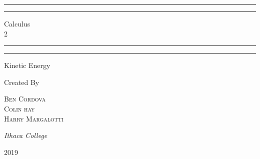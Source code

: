 \documentclass[a4paper, 11pt, oneside]{book} %
\begin{document}
 

\begin{titlepage} %

	\centering %
	
	\scshape %
	
	\vspace*{\baselineskip} %
	
	
	\rule{\textwidth}{1.6pt}\vspace*{-\baselineskip}\vspace*{2pt} %
	\rule{\textwidth}{0.4pt} %
	
	\vspace{0.75\baselineskip} %
	
	{\LARGE Calculus\\ 2\\} %
	
	\vspace{0.75\baselineskip} %
	
	\rule{\textwidth}{0.4pt}\vspace*{-\baselineskip}\vspace{3.2pt} %
	\rule{\textwidth}{1.6pt} %
	
	\vspace{2\baselineskip} %
	
	
	Kinetic Energy %
	
	\vspace*{3\baselineskip} %
	
	
	Created By
	
	\vspace{0.5\baselineskip} %
	
	{\scshape\Large Ben Cordova \\ Colin hay \\ Harry Margalotti \\} %
	
	\vspace{1.0\baselineskip} %
	
	
	\textit{Ithaca College \\} %
	
	\vfill %
	
	2019 %
	

\end{titlepage}
\end{document}
